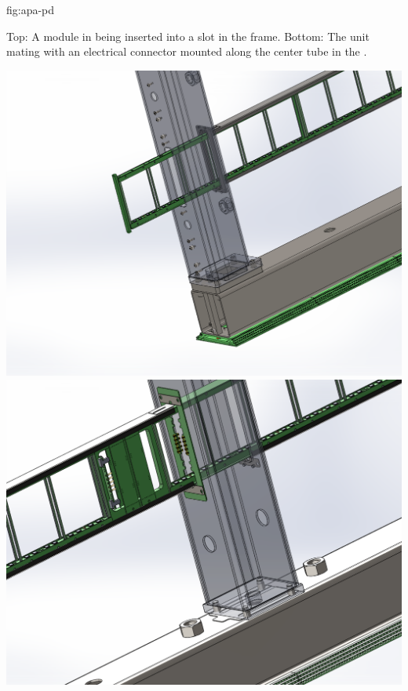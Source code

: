 \begin{dunefigure}{fig:apa-pd}
{Top: A  module in  being inserted into a slot in the frame. Bottom: The  unit mating with an electrical connector mounted along the center tube in the .

}
\includegraphics[height=0.4\textheight,trim=0mm 0mm 0mm 0mm,clip]{graphics/sp-apa-pds-module-insertion-in-frame.pdf}\\
\vspace{2mm}
\includegraphics[height=0.4\textheight,trim=0mm 0mm 0mm 0mm,clip]{graphics/sp-apa-pds-center-tube-insertion.pdf}
\end{dunefigure}

